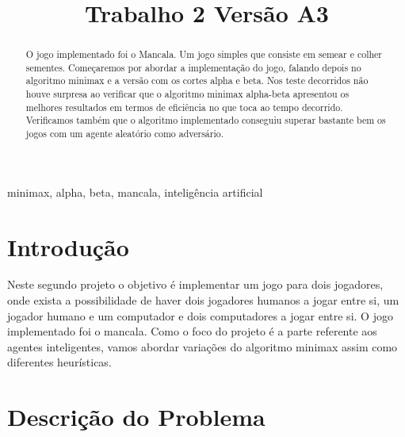 \documentclass[conference]{IEEEtran}
\begin{document}
\title{Trabalho 2 Vers\~ao A3\\
}

\author{
\and
{}
}

\maketitle

\begin{abstract}
O jogo implementado foi o Mancala. Um jogo simples que consiste em semear e colher sementes. Come\c caremos por abordar a implementa\c c\~ao do jogo, falando depois no algoritmo minimax e a vers\~ao com os cortes alpha e beta. Nos teste decorridos não houve surpresa ao verificar que o algoritmo minimax alpha-beta apresentou os melhores resultados em termos de efici\^encia no que toca ao tempo decorrido. Verificamos tamb\'em que o algoritmo implementado conseguiu superar bastante bem os jogos com um agente aleat\'orio como advers\'ario.
\end{abstract}

\begin{IEEEkeywords}
minimax, alpha, beta, mancala, intelig\^encia artificial
\end{IEEEkeywords}

\section{Introdu\c c\~ao}

Neste segundo projeto o objetivo \'e implementar um jogo para dois jogadores, onde exista a possibilidade de haver dois jogadores humanos a jogar entre si, um jogador humano e um computador e dois computadores a jogar entre si.
O jogo implementado foi o mancala. Como o foco do projeto \'e a parte referente aos agentes inteligentes, vamos abordar varia\c c\~oes do algoritmo minimax assim como diferentes heur\'isticas.


\section{Descri\c c\~ao do Problema}
\end{document}
